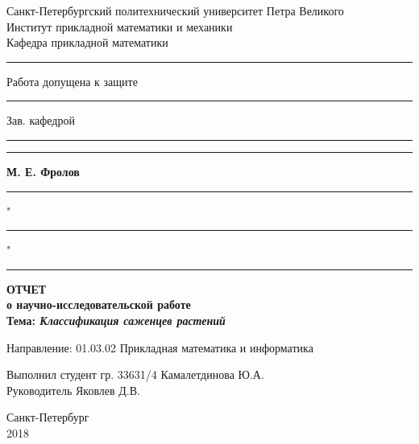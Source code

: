 \begin{titlepage}

\begin{center}
Санкт-Петербургский политехнический университет Петра Великого\\
Институт прикладной математики и механики\\
Кафедра прикладной математики\\
\hrulefill
\end{center}

\begin{flushleft}
\rule{9cm}{0pt} {Работа допущена к защите}\\
\rule{9cm}{0pt} Зав. кафедрой\\
\rule{9cm}{0pt} \rule{2.5cm}{0.5pt} {\bfseries{М. Е. Фролов }}\\
\rule{9cm}{0pt} "\rule{.9cm}{0.5pt}" \rule{4cm}{0.5pt}
\end{flushleft}

\vspace{1.5cm}

\begin{center}
{\large {\bfseries ОТЧЕТ\\
о научно-исследовательской работе}}\\

\bigskip \bfseries{Тема:} {\bfseries \emph{Классификация саженцев растений}}
\end{center}

\vspace{1.cm}

\begin{flushleft}
Направление: 01.03.02 Прикладная математика и информатика

\vspace{1.cm}

Выполнил студент гр. 33631/4 \hfill{Камалетдинова Ю.А.} \\ 

\vspace{0.2cm} Руководитель \hfill{Яковлев Д.В.}

\end{flushleft}

\vspace{1.5cm}

\begin{center}
Санкт-Петербург\\
2018
\end{center}

\end{titlepage}
